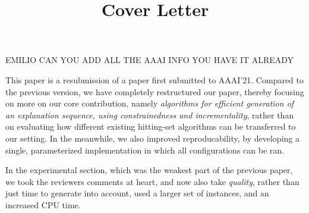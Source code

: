 \documentclass[a4paper,11pt]{article}
\title{Cover Letter}
\author{}
\begin{document}

EMILIO CAN YOU ADD  ALL THE AAAI INFO YOU HAVE IT ALREADY


This paper is a resubmission of a paper first submitted to AAAI'21. 
Compared  to the previous version, we have completely restructured our paper, thereby focusing on more on our core contribution, namely \emph{algorithms for efficient generation of an explanation sequence, using constrainedness and incrementality}, rather than on evaluating how different existing hitting-set algorithms can be transferred to our setting. 
In the meanwhile, we also improved reproducability, by developing a single, parameterized implementation in which all 
configurations can be ran. 

In the experimental section, which was the weakest part of the previous paper, we took the reviewers comments at heart, and now also take \emph{quality}, rather than just time to generate into account, used a larger set of instances, and an increased CPU time. 
\end{document}
